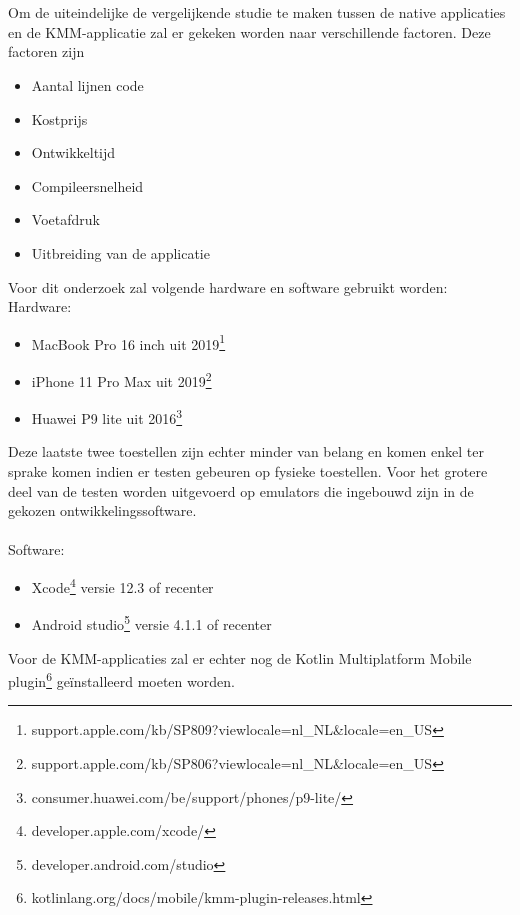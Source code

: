 \\ \\
Om de uiteindelijke de vergelijkende studie te maken tussen de native applicaties en de KMM-applicatie zal er gekeken worden naar verschillende factoren. Deze factoren zijn
\begin{itemize}
    \item Aantal lijnen code
    \item Kostprijs
    \item Ontwikkeltijd
    \item Compileersnelheid
    \item Voetafdruk
    \item Uitbreiding van de applicatie
\end{itemize}

Voor dit onderzoek zal volgende hardware en software gebruikt worden:\\
Hardware:
\begin{itemize}
    \item MacBook Pro 16 inch uit 2019\footnote{support.apple.com/kb/SP809?viewlocale=nl\_NL\&locale=en\_US}
    \item iPhone 11 Pro Max uit 2019\footnote{support.apple.com/kb/SP806?viewlocale=nl\_NL\&locale=en\_US}
    \item Huawei P9 lite uit 2016\footnote{consumer.huawei.com/be/support/phones/p9-lite/}
\end{itemize}
Deze laatste twee toestellen zijn echter minder van belang en komen enkel ter sprake komen indien er testen gebeuren op fysieke toestellen. Voor het grotere deel van de testen worden uitgevoerd op emulators die ingebouwd zijn in de gekozen ontwikkelingssoftware.\\
\\
Software:
\begin{itemize}
    \item Xcode\footnote{developer.apple.com/xcode/} versie 12.3 of recenter
    \item Android studio\footnote{developer.android.com/studio} versie 4.1.1 of recenter
\end{itemize}
Voor de KMM-applicaties zal er echter nog de Kotlin Multiplatform Mobile plugin\footnote{kotlinlang.org/docs/mobile/kmm-plugin-releases.html} geïnstalleerd moeten worden.

